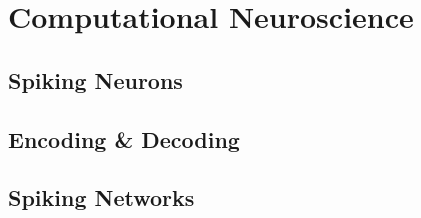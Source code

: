 \usepackage{lipsum}
\usepackage{mathrsfs}
\usepackage{amsmath}
\usepackage{amssymb}
\usepackage{soul}

\usepackage{multicol}
\usepackage{paracol}





\coverpage{\TITLE}{\SUBTITLE}{\AUTHOR}{\DATE}{\SUBJECT}
\newpage

\tableofcontents

\part{Computational Neuroscience}
\newpage
\chapter{Spiking Neurons} \label{ch:spk-neurons}

\newpage
\chapter{Encoding \& Decoding}\label{ch:enco-deco}


\newpage
\chapter{Spiking Networks}\label{ch:spk-networks}


